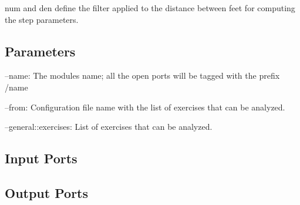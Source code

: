 \begin{DoxyCode}{0}
\DoxyCodeLine{[step\_0]}
\end{DoxyCode}


{\ttfamily num} and {\ttfamily den} define the filter applied to the distance between feet for computing the step parameters.\hypertarget{group__skeletonViewer_parameters_sec}{}\subsection{Parameters}\label{group__skeletonViewer_parameters_sec}

\begin{DoxyItemize}
\item --name\+: The module\textquotesingle{}s name; all the open ports will be tagged with the prefix /name
\item --from\+: Configuration file name with the list of exercises that can be analyzed.
\item --general\+::exercises\+: List of exercises that can be analyzed. 
\end{DoxyItemize}\hypertarget{group__skeletonViewer_inputports_sec}{}\subsection{Input Ports}\label{group__skeletonViewer_inputports_sec}
\hypertarget{group__skeletonViewer_outputports_sec}{}\subsection{Output Ports}\label{group__skeletonViewer_outputports_sec}


